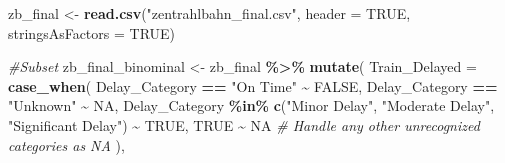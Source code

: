 \documentclass[
]{article}
\newenvironment{Shaded}{\begin{snugshade}}{\end{snugshade}}
\newcommand{\AttributeTok}[1]{\textcolor[rgb]{0.13,0.29,0.53}{#1}}
\newcommand{\CommentTok}[1]{\textcolor[rgb]{0.56,0.35,0.01}{\textit{#1}}}
\newcommand{\ConstantTok}[1]{\textcolor[rgb]{0.56,0.35,0.01}{#1}}
\newcommand{\FunctionTok}[1]{\textcolor[rgb]{0.13,0.29,0.53}{\textbf{#1}}}
\newcommand{\NormalTok}[1]{#1}
\newcommand{\OtherTok}[1]{\textcolor[rgb]{0.56,0.35,0.01}{#1}}
\newcommand{\SpecialCharTok}[1]{\textcolor[rgb]{0.81,0.36,0.00}{\textbf{#1}}}
\newcommand{\StringTok}[1]{\textcolor[rgb]{0.31,0.60,0.02}{#1}}
\begin{document}
\begin{Shaded}
\begin{Highlighting}[]
\NormalTok{zb\_final }\OtherTok{\textless{}{-}} \FunctionTok{read.csv}\NormalTok{(}\StringTok{"zentrahlbahn\_final.csv"}\NormalTok{, }\AttributeTok{header =} \ConstantTok{TRUE}\NormalTok{, }\AttributeTok{stringsAsFactors =} \ConstantTok{TRUE}\NormalTok{)}

\CommentTok{\#Subset}
\NormalTok{zb\_final\_binominal }\OtherTok{\textless{}{-}}\NormalTok{ zb\_final }\SpecialCharTok{\%\textgreater{}\%}
  \FunctionTok{mutate}\NormalTok{(}
    \AttributeTok{Train\_Delayed =} \FunctionTok{case\_when}\NormalTok{(}
\NormalTok{      Delay\_Category }\SpecialCharTok{==} \StringTok{"On Time"} \SpecialCharTok{\textasciitilde{}} \ConstantTok{FALSE}\NormalTok{,    }
\NormalTok{      Delay\_Category }\SpecialCharTok{==} \StringTok{"Unknown"} \SpecialCharTok{\textasciitilde{}} \ConstantTok{NA}\NormalTok{,}
\NormalTok{      Delay\_Category }\SpecialCharTok{\%in\%} \FunctionTok{c}\NormalTok{(}\StringTok{"Minor Delay"}\NormalTok{, }\StringTok{"Moderate Delay"}\NormalTok{, }\StringTok{"Significant Delay"}\NormalTok{) }\SpecialCharTok{\textasciitilde{}} \ConstantTok{TRUE}\NormalTok{,  }
      \ConstantTok{TRUE} \SpecialCharTok{\textasciitilde{}} \ConstantTok{NA}  \CommentTok{\# Handle any other unrecognized categories as NA}
\NormalTok{    ),}
    

\end{Highlighting}
\end{Shaded}
\end{document}
